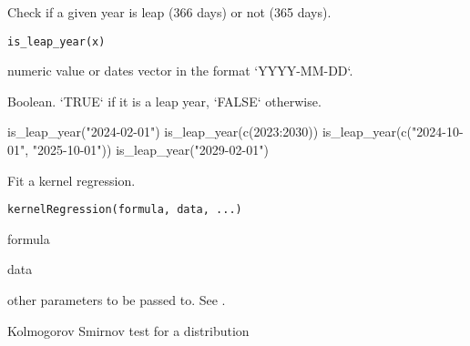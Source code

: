 \documentclass[a4paper]{book}
\begin{document}
%
\begin{Description}\relax
Check if a given year is leap (366 days) or not (365 days).
\end{Description}
%
\begin{Usage}
\begin{verbatim}
is_leap_year(x)
\end{verbatim}
\end{Usage}
%
\begin{Arguments}
\begin{ldescription}
\item[\code{x}] numeric value or dates vector in the format `YYYY-MM-DD`.
\end{ldescription}
\end{Arguments}
%
\begin{Value}
Boolean. `TRUE` if it is a leap year, `FALSE` otherwise.
\end{Value}
%
\begin{Examples}
\begin{ExampleCode}
is_leap_year("2024-02-01")
is_leap_year(c(2023:2030))
is_leap_year(c("2024-10-01", "2025-10-01"))
is_leap_year("2029-02-01")
\end{ExampleCode}
\end{Examples}
%
\begin{Description}\relax
Fit a kernel regression.
\end{Description}
%
\begin{Usage}
\begin{verbatim}
kernelRegression(formula, data, ...)
\end{verbatim}
\end{Usage}
%
\begin{Arguments}
\begin{ldescription}
\item[\code{formula}] formula

\item[\code{data}] data

\item[\code{...}] other parameters to be passed to. See .
\end{ldescription}
\end{Arguments}
%
\begin{Description}\relax
Kolmogorov Smirnov test for a distribution
\end{Description}
\end{document}
